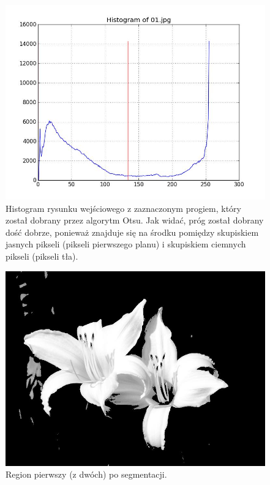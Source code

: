 \documentclass[10pt]{llncs}
\begin{document}
\FloatBarrier

\begin{figure}[h!]
  \centering
  \includegraphics[scale=.3, clip]{img/01_histogram.jpg}
	\caption[]
  {Histogram rysunku wejściowego z zaznaczonym progiem, który został dobrany przez algorytm Otsu. Jak widać, próg został dobrany dość dobrze, ponieważ znajduje się na środku pomiędzy skupiskiem jasnych pikseli (pikseli pierwszego planu) i skupiskiem ciemnych pikseli (pikseli tła).}
\end{figure}

\FloatBarrier

\begin{figure}[h!]
  \centering
  \includegraphics[scale=.3, clip]{img/01_region_01.jpg}
	\caption[]
  {Region pierwszy (z dwóch) po segmentacji.}
\end{figure}
\end{document}
